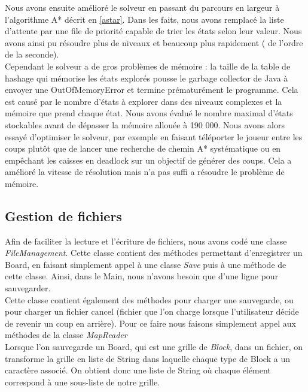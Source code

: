 \documentclass[a4paper,12pt]{article} %
\begin{document}
Nous avons ensuite amélioré le solveur en passant du parcours en largeur à l'algorithme A* décrit en \ref{astar}. Dans les faits, nous avons remplacé la liste d'attente par une file de priorité capable de trier les états selon leur valeur. Nous avons ainsi pu résoudre plus de niveaux et beaucoup plus rapidement ( de l'ordre de la seconde).\\
Cependant le solveur a de gros problèmes de mémoire : la taille de la table de hashage qui mémorise les états explorés pousse le garbage collector de Java à envoyer une OutOfMemoryError et termine prématurément le programme. Cela est causé par le nombre d'états à explorer dans des niveaux complexes et la mémoire que prend chaque état. Nous avons évalué le nombre maximal d'états stockables avant de dépasser la mémoire allouée à 190 000.
Nous avons alors essayé d'optimiser le solveur, par exemple en faisant téléporter le joueur entre les coups plutôt que de lancer une recherche de chemin A* systématique ou en empêchant les caisses en deadlock sur un objectif de générer des coups. Cela a amélioré la vitesse de résolution mais n'a pas suffi a résoudre le problème de mémoire.

\subsection{Gestion de fichiers}

Afin de faciliter la lecture et l'écriture de fichiers, nous avons codé une classe \textit{FileManagement}. Cette classe contient des méthodes permettant d'enregistrer un Board, en faisant simplement appel à une classe \textit{Save} puis à une méthode de cette classe.
Ainsi, dans le Main, nous n'avons besoin que d'une ligne pour sauvegarder.
\\

Cette classe contient également des méthodes pour charger une sauvegarde, ou pour charger un fichier cancel (fichier que l'on charge lorsque l'utilisateur décide de revenir un coup en arrière). Pour ce faire nous faisons simplement appel aux méthodes de la classe \textit{MapReader}
\\

Lorsque l'on sauvegarde un Board, qui est une grille de \textit{Block}, dans un fichier, on transforme la grille en liste de String dans laquelle chaque type de Block a un caractère associé. On obtient donc une liste de String où chaque élément correspond à une sous-liste de notre grille.\\
\end{document}
